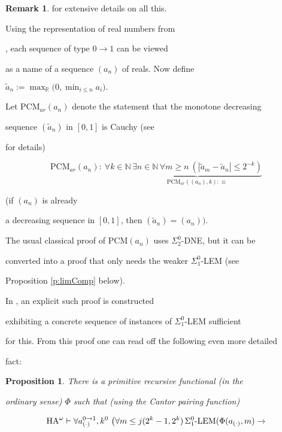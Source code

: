 \documentclass[1p]{elsarticle}
\newcommand{\RR}{\ensuremath{\mathbb{R}}}
\newcommand{\NN}{\ensuremath{\mathbb{N}}}
\theoremstyle{plain}
\newtheorem{prop}[thm]{Proposition}
\theoremstyle{definition}
\newtheorem{rmk}[thm]{Remark}
\theoremstyle{remark}
\theoremstyle{definition}
\begin{document}
{\begin{rmk}
\cite{Kohlenbach(book)} for extensive details on all this.

\end{rmk}

Using the representation of real numbers from 

\cite{Kohlenbach(book)}, each sequence of type $0\to 1$ can be viewed 

as a name of a sequence $(a_n)$ of reals. Now define 

$\tilde{a}_n:=\max_{\RR}\big(0,\min\nolimits_{i\le n}a_i\big).$ 

Let PCM$_{ar}(a_n)$ denote the statement that the monotone decreasing 

sequence $(\tilde{a}_n)$ in $[0,1]$ is Cauchy (see \cite{Kohlenbach(book)} 

for details) 

\[\mbox{PCM}_{ar}(a_n): \ \forall k\in\NN\,\underbrace{\exists n\in\NN\, 

\forall m\ge n\ (|\tilde{a}_m- \tilde{a}_n|\le 

2^{-k})}_{\mbox{PCM}_{ar}((a_n),k)

:\equiv} \]

(if $(a_n)$ is already 

a decreasing sequence in $[0,1]$, then $(\tilde{a}_n)=(a_n)).$ 

The usual classical proof of PCM$(a_n)$ uses $\Sigma^0_2$-DNE, but it can be 

converted into a proof that only needs the weaker $\Sigma^0_1$-LEM (see 

Proposition \ref{p:limComp} below). 

In \cite{Toftdal}, an explicit such proof is constructed 

exhibiting a concrete sequence of instances of $\Sigma^0_1$-LEM sufficient 

for this. From this proof one can read off the following even more detailed 

fact:

\begin{prop} There is a primitive recursive functional (in the 

ordinary sense) $\Phi$ such that (using the Cantor pairing function)

\[ \mbox{\rm HA}^{\omega}\vdash \forall a^{0\to 1}_{(\cdot)}, k^0\ 

\big( \forall m \le j(2^k-1,2^k) \,\Sigma^0_1\mbox{\rm -LEM}(\Phi(a_{(\cdot)},m)

\rightarrow 

\]
\end{prop}}
\end{document}
